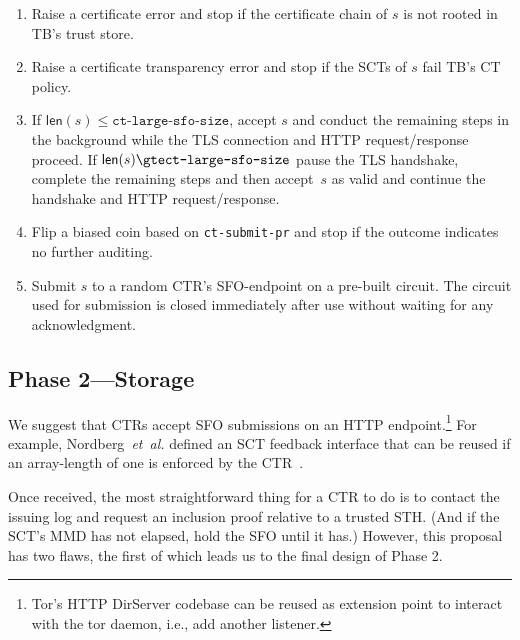\begin{enumerate}
    \item Raise a certificate error and stop if the certificate chain of $s$
        is not rooted in TB's trust store.
    \item Raise a certificate transparency error and stop if the SCTs of $s$
        fail TB's CT policy.
    \item If $\mathsf{len}(s) \le \texttt{ct-large-sfo-size}$, accept $s$ and
        conduct the remaining steps in the background while the TLS connection
        and HTTP request/response proceed. If $\mathsf{len}(s) \gte \texttt{ct-large-sfo-size}$ pause the TLS handshake, complete the remaining steps and then
        accept~$s$ as valid and continue the handshake and HTTP request/response.
    \item Flip a biased coin based on \texttt{ct-submit-pr} and stop if the
        outcome indicates no further auditing.
    \item Submit $s$ to a random CTR's SFO-endpoint on a pre-built circuit.
        The circuit used for submission is closed immediately after use without
        waiting for any acknowledgment.
\end{enumerate}

\subsection{Phase 2---Storage} \label{sec:base:phase2}

We suggest that CTRs accept SFO submissions on an HTTP endpoint.\footnote{%
    Tor's HTTP DirServer codebase can be reused as extension point to interact
    with the tor daemon, i.e., add another listener.
} For example, Nordberg~\emph{et~al.} defined an SCT feedback interface that can
be reused if an array-length of one is enforced by the CTR~\cite{nordberg}.

Once received, the most straightforward thing for a CTR to do is to contact the
issuing log and request an inclusion proof relative to a trusted STH. (And if the
SCT's MMD has not elapsed, hold the SFO until it has.) However, this proposal has
two flaws, the first of which leads us to the final design of Phase 2.

